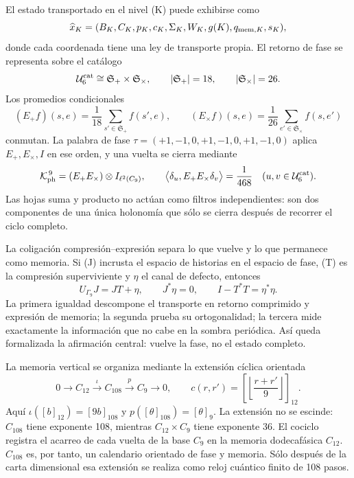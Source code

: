 {El estado transportado en el nivel (K) puede exhibirse como
\begin{equation}
\widehat x_K=
(B_K,C_K,p_K,c_K,\Sigma_K,W_K,g(K),q_{{\rm mem},K},s_K),
\label{p12-83-c3-s1:eq:enriched-state-k}
\end{equation}
donde cada coordenada tiene una ley de transporte propia. El retorno de fase
se representa sobre el catálogo
\[
\mathcal U_6^{\rm cat}\cong\mathfrak S_+\times\mathfrak S_\times,
\qquad |\mathfrak S_+|=18,
\qquad |\mathfrak S_\times|=26.
\]
Los promedios condicionales
\[
(E_+f)(s,e)=\frac1{18}\sum_{s'\in\mathfrak S_+}f(s',e),
\qquad
(E_\times f)(s,e)=\frac1{26}\sum_{e'\in\mathfrak S_\times}f(s,e')
\]
conmutan. La palabra de fase
\(\tau=(+1,-1,0,+1,-1,0,+1,-1,0)\) aplica
\(E_+,E_\times,I\) en ese orden, y una vuelta se cierra mediante
\begin{equation}
\mathcal K_{\rm ph}^{\,9}
=(E_+E_\times)\otimes I_{\ell^2(C_9)},
\qquad
\bigl\langle\delta_u,E_+E_\times\delta_v\bigr\rangle
=\frac1{468}\quad(u,v\in\mathcal U_6^{\rm cat}).
\label{p12-83-c3-s1:eq:joint-nine-holonomy}
\end{equation}
Las hojas suma y producto no actúan como filtros independientes: son dos
componentes de una única holonomía que sólo se cierra después de recorrer el
ciclo completo.

La coligación compresión--expresión separa lo que vuelve y lo que permanece
como memoria. Si (J) incrusta el espacio de historias en el espacio de
fase, (T) es la compresión superviviente y \(\eta\) el canal de defecto,
entonces
\begin{equation}
\boxed{
U_{\Gamma_9}J=JT+\eta,
\qquad J^*\eta=0,
\qquad I-T^*T=\eta^*\eta.}
\label{p12-83-c3-s1:eq:compression-expression}
\end{equation}
La primera igualdad descompone el transporte en retorno comprimido y
expresión de memoria; la segunda prueba su ortogonalidad; la tercera mide
exactamente la información que no cabe en la sombra periódica. Así queda
formalizada la afirmación central: vuelve la fase, no el estado completo.

La memoria vertical se organiza mediante la extensión cíclica orientada
\begin{equation}
0\longrightarrow C_{12}\xrightarrow{\,\iota\,}C_{108}
\xrightarrow{\,p\,}C_9\longrightarrow0,
\qquad
c(r,r')=\left[\left\lfloor\frac{r+r'}9\right\rfloor\right]_{12}.
\label{p12-83-c3-s1:eq:c108-extension}
\end{equation}
Aquí \(\iota([b]_{12})=[9b]_{108}\) y
\(p([\theta]_{108})=[\theta]_9\). La extensión no se escinde:
\(C_{108}\) tiene exponente 108, mientras
\(C_{12}\times C_9\) tiene exponente 36.
El cociclo registra el acarreo de cada vuelta de la base \(C_9\) en la
memoria dodecafásica \(C_{12}\). \(C_{108}\) es, por tanto, un calendario
orientado de fase y memoria. Sólo después de la carta dimensional esa
extensión se realiza como reloj cuántico finito de 108 pasos.

}
